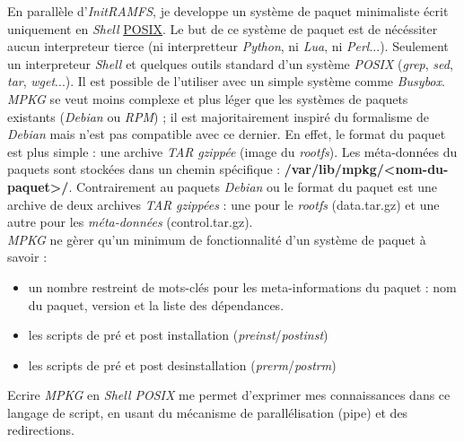 \documentclass[a4paper]{article}
\begin{document}
En parallèle d'\textit{InitRAMFS}, je developpe un système de paquet minimaliste écrit uniquement en \textit{Shell} \href{https://fr.wikipedia.org/wiki/POSIX}{POSIX}. Le but de ce système de paquet est de nécéssiter aucun interpreteur tierce (ni interpretteur \textit{Python}, ni \textit{Lua}, ni \textit{Perl}...). Seulement un interpreteur \textit{Shell} et quelques outils standard d'un système \textit{POSIX} (\textit{grep}, \textit{sed}, \textit{tar}, \textit{wget}...). Il est possible de l'utiliser avec un simple système comme \textit{Busybox}.\\

\textit{MPKG} se veut moins complexe et plus léger que les systèmes de paquets existants (\textit{Debian} ou \textit{RPM}) ; il est majoritairement inspiré du formalisme de \textit{Debian} mais n'est pas compatible avec ce dernier. En effet, le format du paquet est plus simple : une archive \textit{TAR} \textit{gzippée} (image du \textit{rootfs}). Les méta-données du paquets sont stockées dans un chemin spécifique : \textbf{/var/lib/mpkg/<nom-du-paquet>/}.
Contrairement au paquets \textit{Debian} ou le format du paquet est une archive de deux archives \textit{TAR} \textit{gzippées} : une pour le \textit{rootfs} (data.tar.gz) et une autre pour les \textit{méta-données} (control.tar.gz).\\

\textit{MPKG} ne gèrer qu'un minimum de fonctionnalité d'un système de paquet à savoir :
\begin{itemize}
\item un nombre restreint de mots-clés pour les meta-informations du paquet : nom du paquet, version et la liste des dépendances.
\item les scripts de pré et post installation (\textit{preinst}/\textit{postinst})
\item les scripts de pré et post desinstallation (\textit{prerm}/\textit{postrm})
\end{itemize}

Ecrire \textit{MPKG} en \textit{Shell POSIX} me permet d'exprimer mes connaissances dans ce langage de script, en usant du mécanisme de parallélisation (pipe) et des redirections.
\clearpage

\appendix
\end{document}
